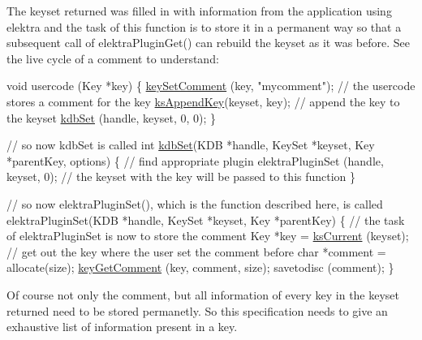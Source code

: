 The keyset {\ttfamily returned} was filled in with information from the application using elektra and the task of this function is to store it in a permanent way so that a subsequent call of elektra\-Plugin\-Get() can rebuild the keyset as it was before. See the live cycle of a comment to understand\-: 
\begin{DoxyCode}
\textcolor{keywordtype}{void} usercode (Key *key)
\{
        \hyperlink{group__keyvalue_ga8863a877a84fa46e6017fe72e49b89c1}{keySetComment} (key, \textcolor{stringliteral}{"mycomment"}); \textcolor{comment}{// the usercode stores a
       comment for the key}
        \hyperlink{group__keyset_gaa5a1d467a4d71041edce68ea7748ce45}{ksAppendKey}(keyset, key); \textcolor{comment}{// append the key to the keyset}
        \hyperlink{group__kdb_ga11436b058408f83d303ca5e996832bcf}{kdbSet} (handle, keyset, 0, 0);
\}

\textcolor{comment}{// so now kdbSet is called}
\textcolor{keywordtype}{int} \hyperlink{group__kdb_ga11436b058408f83d303ca5e996832bcf}{kdbSet}(KDB *handle, KeySet *keyset, Key *parentKey, options)
\{
        \textcolor{comment}{// find appropriate plugin}
        elektraPluginSet (handle, keyset, 0); \textcolor{comment}{// the keyset with the key will
       be passed to this function}
\}

\textcolor{comment}{// so now elektraPluginSet(), which is the function described here, is called}
elektraPluginSet(KDB *handle, KeySet *keyset, Key *parentKey)
\{
        \textcolor{comment}{// the task of elektraPluginSet is now to store the comment}
        Key *key = \hyperlink{group__keyset_ga4287b9416912c5f2ab9c195cb74fb094}{ksCurrent} (keyset); \textcolor{comment}{// get out the key where the
       user set the comment before}
        \textcolor{keywordtype}{char} *comment = allocate(size);
        \hyperlink{group__keyvalue_gafb89735689929ff717cc9f2d0d0b46a2}{keyGetComment} (key, comment, size);
        savetodisc (comment);
\}
\end{DoxyCode}
 Of course not only the comment, but all information of every key in the keyset {\ttfamily returned} need to be stored permanetly. So this specification needs to give an exhaustive list of information present in a key.

